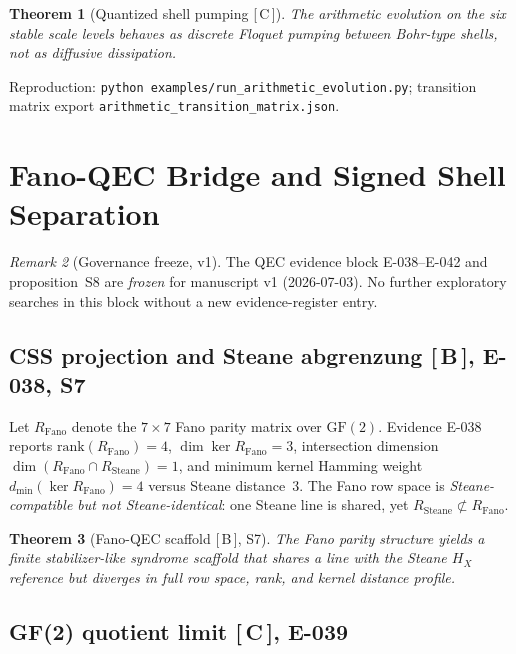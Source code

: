 \documentclass[11pt, lettersize, article]{article}
\newtheorem{theorem}{Theorem}
\theoremstyle{definition}
\theoremstyle{remark}
\newtheorem{remark}[theorem]{Remark}
\newcommand{\evidence}[1]{\textnormal{[\,#1\,]}}
\begin{document}


\begin{theorem}[Quantized shell pumping \evidence{C}]
\label{thm:shell-pumping}
The arithmetic evolution on the six stable scale levels behaves as discrete Floquet pumping between Bohr-type shells, not as diffusive dissipation.
\end{theorem}

Reproduction: \texttt{python examples/run\_arithmetic\_evolution.py}; transition matrix export \texttt{arithmetic\_transition\_matrix.json}.

\section{Fano-QEC Bridge and Signed Shell Separation}
\label{sec:qec}

\begin{remark}[Governance freeze, v1]
The QEC evidence block E-038--E-042 and proposition~S8 are \emph{frozen} for manuscript v1 (2026-07-03).
No further exploratory searches in this block without a new evidence-register entry.
\end{remark}

\subsection{CSS projection and Steane abgrenzung \evidence{B}, E-038, S7}

Let $R_{\mathrm{Fano}}$ denote the $7\times 7$ Fano parity matrix over $\mathrm{GF}(2)$.
Evidence E-038 reports $\mathrm{rank}(R_{\mathrm{Fano}})=4$, $\dim\ker R_{\mathrm{Fano}}=3$, intersection dimension $\dim(R_{\mathrm{Fano}}\cap R_{\mathrm{Steane}})=1$, and minimum kernel Hamming weight $d_{\min}(\ker R_{\mathrm{Fano}})=4$ versus Steane distance~$3$.
The Fano row space is \emph{Steane-compatible but not Steane-identical}: one Steane line is shared, yet $R_{\mathrm{Steane}}\not\subset R_{\mathrm{Fano}}$.

\begin{theorem}[Fano-QEC scaffold \evidence{B}, S7]
\label{thm:s7}
The Fano parity structure yields a finite stabilizer-like syndrome scaffold that shares a line with the Steane $H_X$ reference but diverges in full row space, rank, and kernel distance profile.
\end{theorem}

\subsection{GF(2) quotient limit \evidence{C}, E-039}
\end{document}
